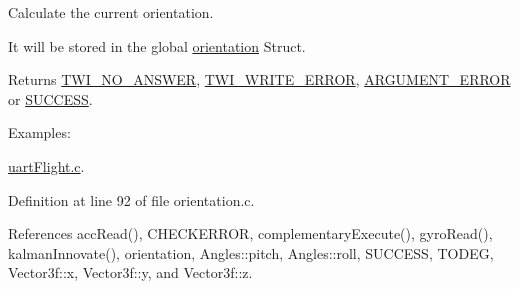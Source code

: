 Calculate the current orientation. 

It will be stored in the global \hyperlink{group__orientation_gacd4a2942520b68691db5aebde4e537a4}{orientation} Struct. \begin{DoxyReturn}{Returns}
\hyperlink{group__error_gga2c3e4bb40f36b262a5214e2da2bca9c5a04d5943ba652af2205c88b247e0c659c}{T\-W\-I\-\_\-\-N\-O\-\_\-\-A\-N\-S\-W\-E\-R}, \hyperlink{group__error_gga2c3e4bb40f36b262a5214e2da2bca9c5ac0e3b3463dcaf220e54794b4711708c9}{T\-W\-I\-\_\-\-W\-R\-I\-T\-E\-\_\-\-E\-R\-R\-O\-R}, \hyperlink{group__error_gga2c3e4bb40f36b262a5214e2da2bca9c5a49ccf277a69dd938c591928aa27c66cc}{A\-R\-G\-U\-M\-E\-N\-T\-\_\-\-E\-R\-R\-O\-R} or \hyperlink{group__error_gga2c3e4bb40f36b262a5214e2da2bca9c5ac7f69f7c9e5aea9b8f54cf02870e2bf8}{S\-U\-C\-C\-E\-S\-S}. 
\end{DoxyReturn}
\begin{Desc}
\item[Examples\-: ]\par
\hyperlink{uart_flight_8c-example}{uart\-Flight.\-c}.\end{Desc}


Definition at line 92 of file orientation.\-c.



References acc\-Read(), C\-H\-E\-C\-K\-E\-R\-R\-O\-R, complementary\-Execute(), gyro\-Read(), kalman\-Innovate(), orientation, Angles\-::pitch, Angles\-::roll, S\-U\-C\-C\-E\-S\-S, T\-O\-D\-E\-G, Vector3f\-::x, Vector3f\-::y, and Vector3f\-::z.


